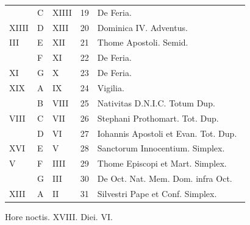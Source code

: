 \begin{center}
\begin{tabular}{l | l | l | r | l l}
\color{Red}  & C & \color{Red} XIIII & 19 & De Feria. & \color{Red} \\
\color{Red} XIIII & D & \color{Red} XIII & 20 & \color{Red} Dominica IV. Adventus. \\
\color{Red} III & E & \color{Red} XII & 21 & Thome Apostoli. Semid. & \color{Red} \\
\color{Red}  & F & \color{Red} XI & 22 & De Feria. & \color{Red} \\
\color{Red} XI & G & \color{Red} X & 23 & De Feria. & \color{Red} \\
\color{Red} XIX & \color{Red} A & \color{Red} IX & 24 & \qquad \color{Red} Vigilia. \\
\color{Red}  & B & \color{Red} VIII & 25 & \multicolumn{2}{l}{\color{Red} Nativitas D.N.I.C. Totum Dup.} \color{Red} \\
\color{Red} VIII & C & \color{Red} VII & 26 & Stephani Prothomart. Tot. Dup. & \color{Red} \\
\color{Red}  & D & \color{Red} VI & 27 & \multicolumn{2}{l}{\color{Red} Iohannis Apostoli et Evan. Tot. Dup.} \color{Red} \\
\color{Red} XVI & E & \color{Red} V & 28 & Sanctorum Innocentium. Simplex. & \color{Red} \\
\color{Red} V & F & \color{Red} IIII & 29 & \color{Red} Thome Episcopi et Mart. Simplex. & \color{Red} \\
\color{Red}  & G & \color{Red} III & 30 & De Oct. Nat. Mem. Dom. infra Oct. & \color{Red} \\
\color{Red} XIII & \color{Red} A & \color{Red} II & 31 & Silvestri Pape et Conf. Simplex. & \\
\end{tabular}
\newline \color{Red} Hore noctis. XVIII. Diei. VI.
\end{center}

\newpage
\color{Red}\color{black}

